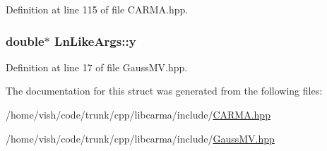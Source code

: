 Definition at line 115 of file C\-A\-R\-M\-A.\-hpp.

\hypertarget{struct_ln_like_args_a49e48f13e6203cf7f629d3485416874f}{
\subsubsection[{y}]{\setlength{\rightskip}{0pt plus 5cm}double$\ast$ Ln\-Like\-Args\-::y}}\label{struct_ln_like_args_a49e48f13e6203cf7f629d3485416874f}


Definition at line 17 of file Gauss\-M\-V.\-hpp.



The documentation for this struct was generated from the following files\-:\begin{DoxyCompactItemize}
\item 
/home/vish/code/trunk/cpp/libcarma/include/\hyperlink{_c_a_r_m_a_8hpp}{C\-A\-R\-M\-A.\-hpp}\item 
/home/vish/code/trunk/cpp/libcarma/include/\hyperlink{_gauss_m_v_8hpp}{Gauss\-M\-V.\-hpp}\end{DoxyCompactItemize}
